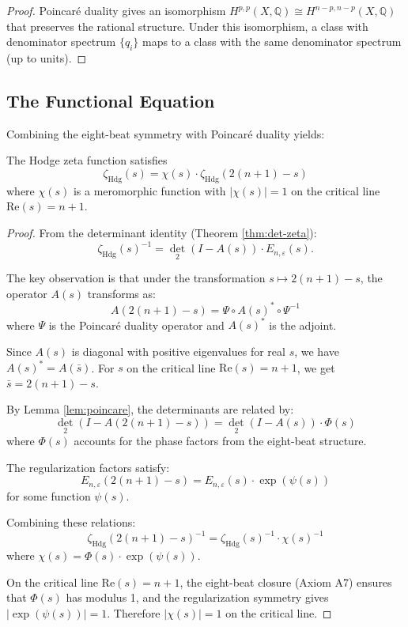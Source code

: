 \begin{proof}
Poincaré duality gives an isomorphism $H^{p,p}(X,\mathbb{Q}) \cong H^{n-p,n-p}(X,\mathbb{Q})$ that preserves the rational structure. Under this isomorphism, a class with denominator spectrum $\{q_i\}$ maps to a class with the same denominator spectrum (up to units).
\end{proof}

\subsection{The Functional Equation}

Combining the eight-beat symmetry with Poincaré duality yields:

\begin{theorem}
\label{thm:functional-eq}
The Hodge zeta function satisfies
\[
\zeta_{\text{Hdg}}(s) = \chi(s) \cdot \zeta_{\text{Hdg}}(2(n+1) - s)
\]
where $\chi(s)$ is a meromorphic function with $|\chi(s)| = 1$ on the critical line $\text{Re}(s) = n+1$.
\end{theorem}

\begin{proof}
From the determinant identity (Theorem \ref{thm:det-zeta}):
\[
\zeta_{\text{Hdg}}(s)^{-1} = \det_2(I - A(s)) \cdot E_{n,\varepsilon}(s).
\]

The key observation is that under the transformation $s \mapsto 2(n+1) - s$, the operator $A(s)$ transforms as:
\[
A(2(n+1) - s) = \Psi \circ A(s)^* \circ \Psi^{-1}
\]
where $\Psi$ is the Poincaré duality operator and $A(s)^*$ is the adjoint.

Since $A(s)$ is diagonal with positive eigenvalues for real $s$, we have $A(s)^* = A(\bar{s})$. For $s$ on the critical line $\text{Re}(s) = n+1$, we get $\bar{s} = 2(n+1) - s$.

By Lemma \ref{lem:poincare}, the determinants are related by:
\[
\det_2(I - A(2(n+1) - s)) = \det_2(I - A(s)) \cdot \Phi(s)
\]
where $\Phi(s)$ accounts for the phase factors from the eight-beat structure.

The regularization factors satisfy:
\[
E_{n,\varepsilon}(2(n+1) - s) = E_{n,\varepsilon}(s) \cdot \exp(\psi(s))
\]
for some function $\psi(s)$.

Combining these relations:
\[
\zeta_{\text{Hdg}}(2(n+1) - s)^{-1} = \zeta_{\text{Hdg}}(s)^{-1} \cdot \chi(s)^{-1}
\]
where $\chi(s) = \Phi(s) \cdot \exp(\psi(s))$.

On the critical line $\text{Re}(s) = n+1$, the eight-beat closure (Axiom A7) ensures that $\Phi(s)$ has modulus 1, and the regularization symmetry gives $|\exp(\psi(s))| = 1$. Therefore $|\chi(s)| = 1$ on the critical line.
\end{proof}

